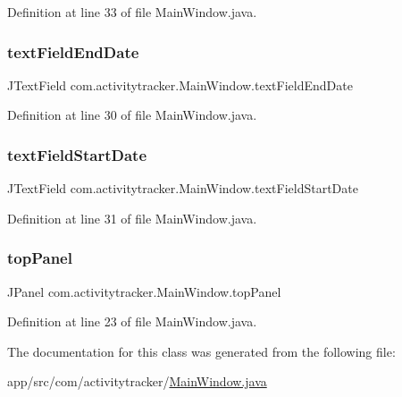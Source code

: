 Definition at line 33 of file Main\+Window.\+java.

\mbox{\label{classcom_1_1activitytracker_1_1_main_window_ab3ce75740bdeca26fec4325f1d5260e1}} 
\subsubsection{\texorpdfstring{textFieldEndDate}{textFieldEndDate}}
{\footnotesize\ttfamily J\+Text\+Field com.\+activitytracker.\+Main\+Window.\+text\+Field\+End\+Date\hspace{0.3cm}{\ttfamily [private]}}



Definition at line 30 of file Main\+Window.\+java.

\mbox{\label{classcom_1_1activitytracker_1_1_main_window_a57257f1403dc59df568de3ac51cdb90a}} 
\subsubsection{\texorpdfstring{textFieldStartDate}{textFieldStartDate}}
{\footnotesize\ttfamily J\+Text\+Field com.\+activitytracker.\+Main\+Window.\+text\+Field\+Start\+Date\hspace{0.3cm}{\ttfamily [private]}}



Definition at line 31 of file Main\+Window.\+java.

\mbox{\label{classcom_1_1activitytracker_1_1_main_window_a6baf76b2b8ede1ba82fc6d096ddb580b}} 
\subsubsection{\texorpdfstring{topPanel}{topPanel}}
{\footnotesize\ttfamily J\+Panel com.\+activitytracker.\+Main\+Window.\+top\+Panel\hspace{0.3cm}{\ttfamily [private]}}



Definition at line 23 of file Main\+Window.\+java.



The documentation for this class was generated from the following file\+:\begin{DoxyCompactItemize}
\item 
app/src/com/activitytracker/\mbox{\hyperlink{_main_window_8java}{Main\+Window.\+java}}\end{DoxyCompactItemize}
